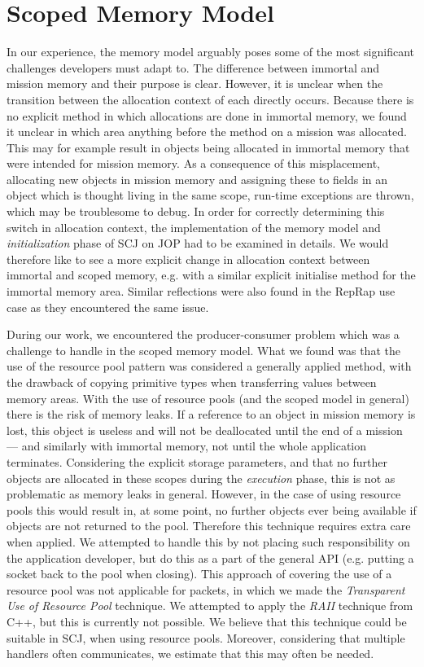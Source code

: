 \section{Scoped Memory Model} %
 \label{sec:scoped_memory_model}
In our experience, the memory model arguably poses some of the most significant challenges developers must adapt to. The difference between immortal and mission memory and their purpose is clear. However, it is unclear when the transition between the allocation context of each directly occurs. Because there is no explicit method in which allocations are done in immortal memory, we found it unclear in which area anything before the  method on a mission was allocated. This may for example result in objects being allocated in immortal memory that were intended for mission memory. As a consequence of this misplacement, allocating new objects in mission memory and assigning these to fields in an object which is thought living in the same scope, run-time exceptions are thrown, which may be troublesome to debug. In order for correctly determining this switch in allocation context, the implementation of the memory model and \textit{initialization} phase of SCJ on JOP had to be examined in details. We would therefore like to see a more explicit change in allocation context between immortal and scoped memory, e.g. with a similar explicit initialise method for the immortal memory area. Similar reflections were also found in the RepRap use case\cite{Schoeberl:2012:RepRap} as they encountered the same issue.

During our work, we encountered the producer-consumer problem which was a challenge to handle in the scoped memory model. What we found was that the use of the resource pool pattern was considered a generally applied method, with the drawback of copying primitive types when transferring values between memory areas. With the use of resource pools (and the scoped model in general) there is the risk of memory leaks. If a reference to an object in mission memory is lost, this object is useless and will not be deallocated until the end of a mission --- and similarly with immortal memory, not until the whole application terminates. Considering the explicit storage parameters, and that no further objects are allocated in these scopes during the \textit{execution} phase, this is not as problematic as memory leaks in general. However, in the case of using resource pools this would result in, at some point, no further objects ever being available if objects are not returned to the pool. Therefore this technique requires extra care when applied. We attempted to handle this by not placing such responsibility on the application developer, but do this as a part of the general API (e.g. putting a socket back to the pool when closing). This approach of covering the use of a resource pool was not applicable for packets, in which we made the \textit{Transparent Use of Resource Pool} technique. We attempted to apply the \textit{RAII} technique from C++, but this is currently not possible. We believe that this technique could be suitable in SCJ, when using resource pools. Moreover, considering that multiple handlers often communicates, we estimate that this may often be needed.

